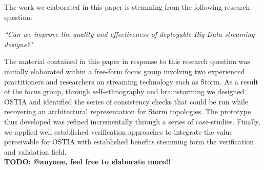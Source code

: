 
The work we elaborated in this paper is stemming from the following research question:

\begin{center}
\emph{``Can we improve the quality and effectiveness of deployable Big-Data streaming designs?"}
\end{center}

The material contained in this paper in response to this research question was initially elaborated within a free-form focus group \cite{fg} involving two experienced practitioners and researchers on streaming technology such as Storm. As a result of the focus group, through self-ethnography \cite{selfeth} and brainstorming we designed OSTIA and identified the series of consistency checks that could be run while recovering an architectural representation for Storm topologies. The prototype thus developed was refined incrementally through a series of case-studies. Finally, we applied well established verification approaches to integrate the value perceivable for OSTIA with established benefits stemming form the verification and validation field.\\
\textbf{TODO: @anyone, feel free to elaborate more!!}